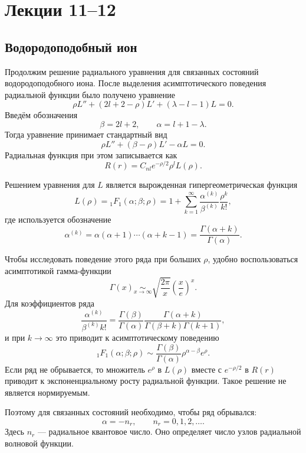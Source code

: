 \documentclass[12pt,a4paper]{article}
\begin{document}
\section{Лекции 11--12}

\subsection{Водородоподобный ион}

Продолжим решение радиального уравнения для связанных состояний
водородоподобного иона. После выделения асимптотического поведения
радиальной функции было получено уравнение
\[
    \rho L''+(2l+2-\rho)L'+(\lambda-l-1)L=0.
\]
Введём обозначения
\[
    \beta=2l+2,
    \qquad
    \alpha=l+1-\lambda.
\]
Тогда уравнение принимает стандартный вид
\[
    \boxed{
        \rho L''+(\beta-\rho)L'-\alpha L=0
    }.
\]
Радиальная функция при этом записывается как
\[
    \boxed{
        R(r)=C_{nl}e^{-\rho/2}\rho^lL(\rho)
    }.
\]

Решением уравнения для $L$ является вырожденная гипергеометрическая
функция
\[
    L(\rho)
    =
    {}_1F_1(\alpha;\beta;\rho)
    =
    1+
    \sum_{k=1}^{\infty}
    \frac{\alpha^{(k)}}{\beta^{(k)}}
    \frac{\rho^k}{k!},
\]
где используется обозначение
\[
    \alpha^{(k)}
    =
    \alpha(\alpha+1)\cdots(\alpha+k-1)
    =
    \frac{\Gamma(\alpha+k)}{\Gamma(\alpha)}.
\]

Чтобы исследовать поведение этого ряда при больших $\rho$, удобно
воспользоваться асимптотикой гамма-функции
\[
    \Gamma(x)
    \underset{x\to\infty}{\sim}
    \sqrt{\frac{2\pi}{x}}
    \left(\frac{x}{e}\right)^x.
\]
Для коэффициентов ряда
\[
    \frac{\alpha^{(k)}}{\beta^{(k)}k!}
    =
    \frac{\Gamma(\beta)}{\Gamma(\alpha)}
    \frac{\Gamma(\alpha+k)}
         {\Gamma(\beta+k)\Gamma(k+1)},
\]
и при $k\to\infty$ это приводит к асимптотическому поведению
\[
    {}_1F_1(\alpha;\beta;\rho)
    \sim
    \frac{\Gamma(\beta)}{\Gamma(\alpha)}
    \rho^{\alpha-\beta}e^\rho.
\]
Если ряд не обрывается, то множитель $e^\rho$ в $L(\rho)$ вместе с
$e^{-\rho/2}$ в $R(r)$ приводит к экспоненциальному росту радиальной
функции. Такое решение не является нормируемым.

Поэтому для связанных состояний необходимо, чтобы ряд обрывался:
\[
    \boxed{
        \alpha=-n_r,
        \qquad
        n_r=0,1,2,\ldots
    }.
\]
Здесь $n_r$ --- радиальное квантовое число. Оно определяет число узлов
радиальной волновой функции.
\end{document}

